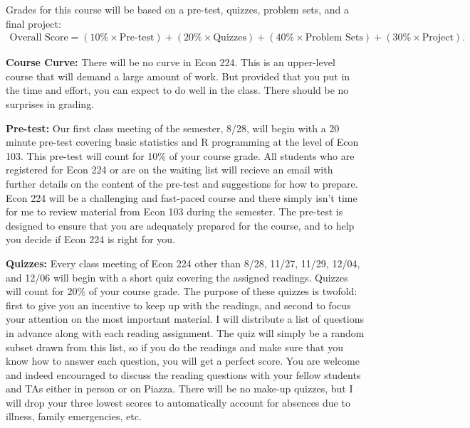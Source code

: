 \documentclass[11pt, letterpaper]{article}
\begin{document}
Grades for this course will be based on a pre-test, quizzes, problem sets, and a final project:
	\begin{equation*}
	\begin{split}
    \mbox{Overall Score} = (10\% \times \mbox{Pre-test})  + (20\% \times \mbox{Quizzes}) + (40\% \times \mbox{Problem Sets}) +  (30\% \times \mbox{Project}).
	\end{split}
	\end{equation*}

\medskip


\noindent \textbf{Course Curve:}
There will be no curve in Econ 224. 
This is an upper-level course that will demand a large amount of work.
But provided that you put in the time and effort, you can expect to do well in the class. 
There should be no surprises in grading.

\medskip 

\noindent \textbf{Pre-test:} Our first class meeting of the semester, 8/28, will begin with a 20 minute pre-test covering basic statistics and R programming at the level of Econ 103.
This pre-test will count for 10\% of your course grade.
All students who are registered for Econ 224 or are on the waiting list will recieve an email with further details on the content of the pre-test and suggestions for how to prepare.
Econ 224 will be a challenging and fast-paced course and there simply isn't time for me to review material from Econ 103 during the semester.
The pre-test is designed to ensure that you are adequately prepared for the course, and to help you decide if Econ 224 is right for you.

\medskip


\noindent \textbf{Quizzes:} 
Every class meeting of Econ 224 other than 8/28, 11/27, 11/29, 12/04, and 12/06 will begin with a short quiz covering the assigned readings.
Quizzes will count for 20\% of your course grade.
The purpose of these quizzes is twofold: first to give you an incentive to keep up with the readings, and second to focus your attention on the most important material.
I will distribute a list of questions in advance along with each reading assignment.
The quiz will simply be a random subset drawn from this list, so if you do the readings and make sure that you know how to answer each question, you will get a perfect score.
You are welcome and indeed encouraged to discuss the reading questions with your fellow students and TAs either in person or on Piazza.
There will be no make-up quizzes, but I will drop your three lowest scores to automatically account for absences due to illness, family emergencies, etc.
\end{document}
